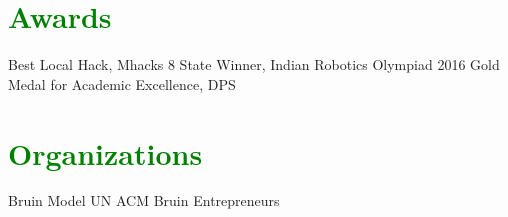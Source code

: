 \documentclass[letterpaper]{deedy-resume-openfont} %
\begin{document}
\begin{minipage}[t]{0.33\textwidth}
\sectionsep %


\section{\textcolor{GREEN}{Awards}}

Best Local Hack, Mhacks 8 \textbullet{} State Winner, Indian Robotics Olympiad 2016 \textbullet{} Gold Medal for Academic Excellence, DPS\\


\sectionsep %



\section{\textcolor{GREEN}{Organizations}}
Bruin Model UN \textbullet{} ACM \textbullet{} Bruin Entrepreneurs \\



\end{minipage} %
\hfill
%
%
\end{document}
